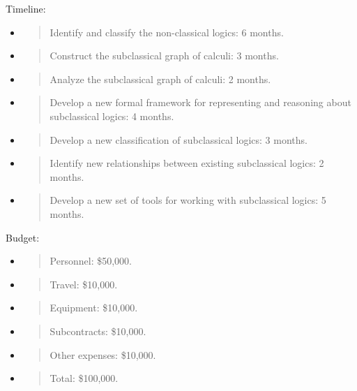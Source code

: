 Timeline:

\begin{itemize}
\item
  \begin{quote}
  Identify and classify the non-classical logics: 6 months.
  \end{quote}
\item
  \begin{quote}
  Construct the subclassical graph of calculi: 3 months.
  \end{quote}
\item
  \begin{quote}
  Analyze the subclassical graph of calculi: 2 months.
  \end{quote}
\item
  \begin{quote}
  Develop a new formal framework for representing and reasoning about
  subclassical logics: 4 months.
  \end{quote}
\item
  \begin{quote}
  Develop a new classification of subclassical logics: 3 months.
  \end{quote}
\item
  \begin{quote}
  Identify new relationships between existing subclassical logics: 2
  months.
  \end{quote}
\item
  \begin{quote}
  Develop a new set of tools for working with subclassical logics: 5
  months.
  \end{quote}
\end{itemize}

Budget:

\begin{itemize}
\item
  \begin{quote}
  Personnel: \$50,000.
  \end{quote}
\item
  \begin{quote}
  Travel: \$10,000.
  \end{quote}
\item
  \begin{quote}
  Equipment: \$10,000.
  \end{quote}
\item
  \begin{quote}
  Subcontracts: \$10,000.
  \end{quote}
\item
  \begin{quote}
  Other expenses: \$10,000.
  \end{quote}
\item
  \begin{quote}
  Total: \$100,000.
  \end{quote}
\end{itemize}

